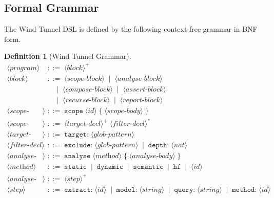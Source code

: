 \documentclass[12pt,a4paper,twocolumn]{article}
\theoremstyle{plain}
\theoremstyle{definition}
\newtheorem{definition}[theorem]{Definition}
\theoremstyle{remark}
\begin{document}
\subsection{Formal Grammar}

The Wind Tunnel DSL is defined by the following context-free grammar in BNF
form.

\begin{definition}[Wind Tunnel Grammar]
\label{def:grammar}
\begin{align*}
\langle\textit{program}\rangle &\;::=\; \langle\textit{block}\rangle^+ \\[4pt]
\langle\textit{block}\rangle &\;::=\;
  \langle\textit{scope-block}\rangle \;\mid\; \langle\textit{analyse-block}\rangle \\
  &\quad\;\mid\; \langle\textit{compose-block}\rangle \;\mid\;
    \langle\textit{assert-block}\rangle \\
  &\quad\;\mid\; \langle\textit{recurse-block}\rangle \;\mid\;
    \langle\textit{report-block}\rangle \\[4pt]
\langle\textit{scope-block}\rangle &\;::=\;
  \texttt{scope}\;\langle\textit{id}\rangle\;\texttt{\{}\;
  \langle\textit{scope-body}\rangle\;\texttt{\}} \\
\langle\textit{scope-body}\rangle &\;::=\;
  \langle\textit{target-decl}\rangle^+\;\langle\textit{filter-decl}\rangle^* \\
\langle\textit{target-decl}\rangle &\;::=\;
  \texttt{target:}\;\langle\textit{glob-pattern}\rangle \\
\langle\textit{filter-decl}\rangle &\;::=\;
  \texttt{exclude:}\;\langle\textit{glob-pattern}\rangle
  \;\mid\; \texttt{depth:}\;\langle\textit{nat}\rangle \\[4pt]
\langle\textit{analyse-block}\rangle &\;::=\;
  \texttt{analyse}\;\langle\textit{method}\rangle\;\texttt{\{}\;
  \langle\textit{analyse-body}\rangle\;\texttt{\}} \\
\langle\textit{method}\rangle &\;::=\;
  \texttt{static} \;\mid\; \texttt{dynamic} \;\mid\;
  \texttt{semantic} \;\mid\; \texttt{hf} \;\mid\; \langle\textit{id}\rangle \\
\langle\textit{analyse-body}\rangle &\;::=\;
  \langle\textit{step}\rangle^+ \\
\langle\textit{step}\rangle &\;::=\;
  \texttt{extract:}\;\langle\textit{id}\rangle
  \;\mid\; \texttt{model:}\;\langle\textit{string}\rangle
  \;\mid\; \texttt{query:}\;\langle\textit{string}\rangle
  \;\mid\; \texttt{method:}\;\langle\textit{id}\rangle \\[4pt]

\end{align*}
\end{definition}
\end{document}
